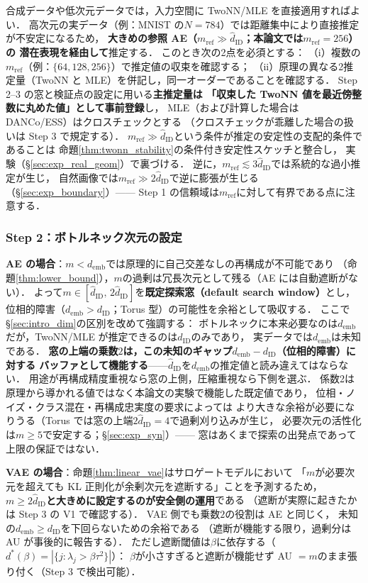 \documentclass[11pt,a4paper]{jsarticle}
\newcommand{\dID}{d_{\mathrm{ID}}}
\newcommand{\hatdID}{\hat{d}_{\mathrm{ID}}}
\newcommand{\demb}{d_{\mathrm{emb}}}
\newcommand{\dstar}{d^{*}(\beta)}
\begin{document}
合成データや低次元データでは，入力空間に TwoNN/MLE を直接適用すればよい．
高次元の実データ（例：MNIST の$N = 784$）では距離集中により直接推定が不安定になるため，
\textbf{大きめの参照 AE（$m_{\mathrm{ref}} \gg \hatdID$；本論文では$m_{\mathrm{ref}} = 256$）の
潜在表現を経由して}推定する．
このとき次の2点を必須とする：
（i）複数の$m_{\mathrm{ref}}$（例：$\{64, 128, 256\}$）で推定値の収束を確認する；
（ii）原理の異なる2推定量（TwoNN と MLE）を併記し，同一オーダーであることを確認する．
Step 2--3 の窓と検証点の設定に用いる\textbf{主推定量は
「収束した TwoNN 値を最近傍整数に丸めた値」として事前登録}し，
MLE（および計算した場合は DANCo/ESS）はクロスチェックとする
（クロスチェックが乖離した場合の扱いは Step 3 で規定する）．
$m_{\mathrm{ref}} \gg \hatdID$という条件が推定の安定性の支配的条件であることは
命題\ref{thm:twonn_stability}の条件付き安定性スケッチと整合し，
実験（§\ref{sec:exp_real_geom}）で裏づける．
逆に，$m_{\mathrm{ref}} \lesssim 3\hatdID$では系統的な過小推定が生じ，
自然画像では$m_{\mathrm{ref}} \gg 2\hatdID$で逆に膨張が生じる（§\ref{sec:exp_boundary}）——
Step 1 の信頼域は$m_{\mathrm{ref}}$に対して有界である点に注意する．

\subsubsection{Step 2：ボトルネック次元の設定}\label{sec:protocol_s2}

\textbf{AE の場合}：$m < \demb$では原理的に自己交差なしの再構成が不可能であり
（命題\ref{thm:lower_bound}），$m$の過剰は冗長次元として残る（AE には自動遮断がない）．
よって$m \in [\hatdID,\, 2\hatdID]$を\textbf{既定探索窓（default search window）}とし，
位相的障害（$\demb > \dID$；Torus 型）の可能性を余裕として吸収する．
ここで§\ref{sec:intro_dim}の区別を改めて強調する：
ボトルネックに本来必要なのは$\demb$だが，TwoNN/MLE が推定できるのは$\dID$のみであり，
実データでは$\demb$は未知である．
\textbf{窓の上端の乗数$2$は，この未知のギャップ$\demb - \dID$（位相的障害）に対する
バッファとして機能する}——$\hatdID$を$\demb$の推定値と読み違えてはならない．
用途が再構成精度重視なら窓の上側，圧縮重視なら下側を選ぶ．
係数2は原理から導かれる値ではなく本論文の実験で機能した既定値であり，
位相・ノイズ・クラス混在・再構成忠実度の要求によっては
より大きな余裕が必要になりうる（Torus では窓の上端$2\hatdID = 4$で過剰刈り込みが生じ，
必要次元の活性化は$m \geq 5$で安定する；§\ref{sec:exp_syn}）——
窓はあくまで探索の出発点であって上限の保証ではない．

\textbf{VAE の場合}：命題\ref{thm:linear_vae}はサロゲートモデルにおいて
「$m$が必要次元を超えても KL 正則化が余剰次元を遮断する」ことを予測するため，
\textbf{$m \geq 2\hatdID$と大きめに設定するのが安全側の運用}である
（遮断が実際に起きたかは Step 3 の V1 で確認する）．
VAE 側でも乗数$2$の役割は AE と同じく，
未知の$\demb \geq \dID$を下回らないための余裕である
（遮断が機能する限り，過剰分は AU が事後的に報告する）．
ただし遮断閾値は$\beta$に依存する（$\dstar = |\{j : \lambda_j > \beta\tau^2\}|$）：
$\beta$が小さすぎると遮断が機能せず AU $= m$のまま張り付く（Step 3 で検出可能）．
\end{document}
